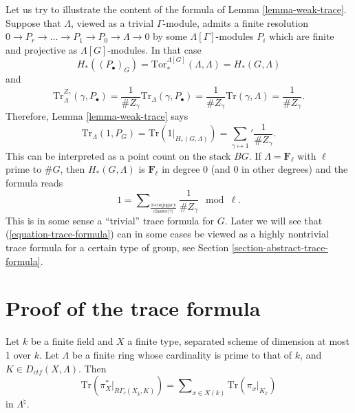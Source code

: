 \begin{remark}
\label{remark-content-trivial-trace}
Let us try to illustrate the content of the formula of
Lemma \ref{lemma-weak-trace}.
Suppose that $\Lambda$, viewed as a trivial $\Gamma$-module, admits a finite
resolution
$
0\to P_r\to \ldots \to P_1 \to P_0\to \Lambda\to 0
$
by some $\Lambda[\Gamma]$-modules $P_i$ which are finite and projective as
$\Lambda[G]$-modules. In that case
$$
H_*\left(\left(P_\bullet\right)_G\right) =
\text{Tor}_*^{\Lambda[G]}\left(\Lambda, \Lambda\right) = H_*(G, \Lambda)
$$
and
$$
\text{Tr}_\Lambda^{Z_\gamma}\left(\gamma, P_\bullet\right) =\frac{1}{\#
Z_\gamma}\text{Tr}_\Lambda(\gamma, P_\bullet)=\frac{1}{\#
Z_\gamma}\text{Tr}(\gamma, \Lambda) = \frac{1}{\# Z_\gamma}.
$$
Therefore, Lemma \ref{lemma-weak-trace} says
$$
\text{Tr}_\Lambda (1 , P_G)
= \text{Tr}\left(1 |_{H_*(G, \Lambda)}\right)
= {\sum_{\gamma\mapsto 1}}'\frac{1}{\# Z_\gamma}.
$$
This can be interpreted as a point count on the stack $BG$. If
$\Lambda = \mathbf{F}_\ell$ with $\ell$ prime to $\# G$, then
$H_*(G, \Lambda)$ is $\mathbf{F}_\ell$ in degree 0 (and $0$ in
other degrees) and the formula reads
$$
1 =
\sum\nolimits_{
\frac{\sigma\text{-conjugacy}}{\text{classes}\langle\gamma\rangle}
}
\frac{1}{\# Z_\gamma} \mod \ell.
$$
This is in some sense a ``trivial'' trace formula for $G$.
Later we will see that (\ref{equation-trace-formula}) can in
some cases be viewed as a highly nontrivial trace formula for a
certain type of group, see
Section \ref{section-abstract-trace-formula}.
\end{remark}





\section{Proof of the trace formula}
\label{section-proof-trace-formula}

\begin{theorem}
\label{theorem-trace-formula-again}
Let $k$ be a finite field and $X$ a finite type, separated scheme of dimension
at most 1 over $k$. Let $\Lambda$ be a finite ring whose cardinality is prime
to that of $k$, and $K\in D_{ctf}(X, \Lambda)$. Then
\begin{equation}
\label{equation-trace-formula-again}
\text{Tr}(\pi_X^* |_{R\Gamma_c(X_{\bar k}, K)})
=
\sum\nolimits_{x\in X(k)}
\text{Tr}(\pi_x |_{K_{\bar x}})
\end{equation}
in $\Lambda^{\natural}$.
\end{theorem}

